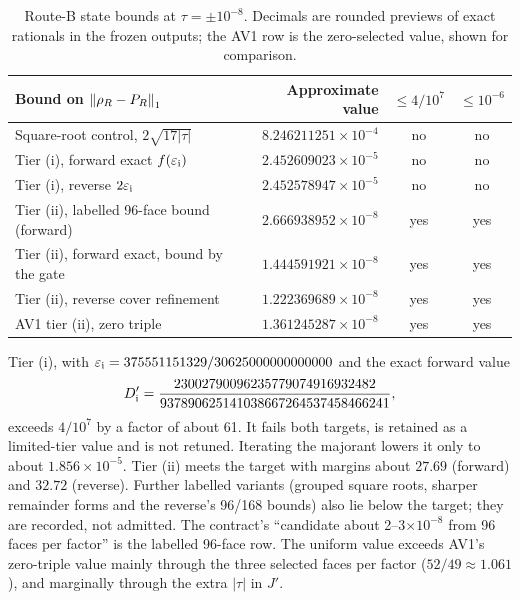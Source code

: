 \begin{table}[htbp]
\centering\small
\caption{Route-B state bounds at $\tau=\pm10^{-8}$. Decimals are rounded
previews of exact rationals in the frozen outputs; the AV1 row is the
zero-selected value, shown for comparison.}
\label{tab:ax1-tiers}
\begin{tabular}{lrcc}
\toprule
Bound on $\left\lVert\rho_R-P_R\right\rVert_1$ & Approximate value & $\le4/10^7$ & $\le10^{-6}$\\
\midrule
Square-root control, $2\sqrt{17|\tau|}$ & $8.246211251\times10^{-4}$ & no & no\\
Tier (i), forward exact $f(\varepsilon_{\rm i})$ & $2.452609023\times10^{-5}$ & no & no\\
Tier (i), reverse $2\varepsilon_{\rm i}$ & $2.452578947\times10^{-5}$ & no & no\\
Tier (ii), labelled 96-face bound (forward) & $2.666938952\times10^{-8}$ & yes & yes\\
Tier (ii), forward exact, bound by the gate & $1.444591921\times10^{-8}$ & yes & yes\\
Tier (ii), reverse cover refinement & $1.222369689\times10^{-8}$ & yes & yes\\
AV1 tier (ii), zero triple & $1.361245287\times10^{-8}$ & yes & yes\\
\bottomrule
\end{tabular}
\end{table}

Tier (i), with
$\varepsilon_{\rm i}=375551151329/30625000000000000$ and the exact forward
value
\[
 D'_{\rm i}=\frac{23002790096235779074916932482}{937890625141038667264537458466241},
\]
exceeds $4/10^7$ by a factor of about 61. It fails both targets, is retained
as a limited-tier value and is not retuned. Iterating the majorant lowers it
only to about $1.856\times10^{-5}$. Tier (ii) meets the target with margins
about $27.69$ (forward) and $32.72$ (reverse). Further labelled variants
(grouped square roots, sharper remainder forms and the reverse's 96/168
bounds) also lie below the target; they are recorded, not admitted. The
contract's ``candidate about 2--3$\times10^{-8}$ from 96 faces per factor'' is
the labelled 96-face row. The uniform value exceeds AV1's zero-triple value
mainly through the three selected faces per factor ($52/49\approx1.061$), and
marginally through the extra $|\tau|$ in $J'$.

